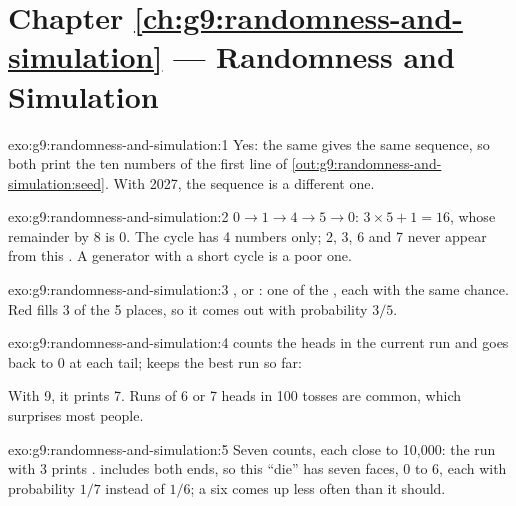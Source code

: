 \section*{Chapter \ref{ch:g9:randomness-and-simulation} --- Randomness and Simulation}

\begin{solution}{exo:g9:randomness-and-simulation:1}
Yes: the same  gives the same sequence, so both print the ten numbers of
the first line of \cref{out:g9:randomness-and-simulation:seed}. With  2027,
the sequence is a different one.
\end{solution}

\begin{solution}{exo:g9:randomness-and-simulation:2}
$0 \to 1 \to 4 \to 5 \to 0$: $3 \times 5 + 1 = 16$, whose remainder by 8 is 0.
The cycle has 4 numbers only; 2, 3, 6 and 7 never appear from this . A
generator with a short cycle is a poor one.
\end{solution}

\begin{solution}{exo:g9:randomness-and-simulation:3}
,  or : one  of the , each 
with the same chance. Red fills 3 of the 5 places, so it comes out with
probability $3/5$.
\end{solution}

\begin{solution}{exo:g9:randomness-and-simulation:4}
 counts the heads in the current run and goes back to 0 at each tail;
 keeps the best run so far:

\label{lst:g9:randomness-and-simulation:sol-heads}

With  9, it prints 7. Runs of 6 or 7 heads in 100 tosses are common, which
surprises most people.
\end{solution}

\begin{solution}{exo:g9:randomness-and-simulation:5}
Seven counts, each close to 10,000: the run with  3 prints
\code{[10017, 9979, 10175, 9874, 9984, 9905, 10066]}. 
includes both ends, so this ``die'' has seven faces, 0 to 6, each with
probability $1/7$ instead of $1/6$; a six comes up less often than it should.
\end{solution}

